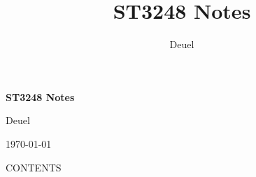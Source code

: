 \documentclass{Base}
\title{ST3248 Notes}
\author{Deuel}
\begin{document}
\frontmatter

\thispagestyle{plain}
\begin{center}
\vspace*{1cm}
{\LARGE\bfseries ST3248 Notes\par}
\vspace{0.5cm}
{\large Deuel\par}
\vspace{0.5cm}
{\large \today\par}
\end{center}

\vspace{1cm}
\makeatletter
\begingroup
  \centering\fontsize{12.5}{14}\selectfont\uppercase{Contents}\par
\endgroup
{}
\makeatother
\clearpage

\mainmatter







\end{document}

